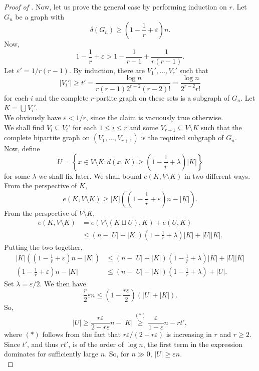 \begin{proof}[Proof of ]
				Now, let us prove the general case by performing induction on $r$. Let $G_n$ be a graph with
				\[ \delta(G_n) \ge \left(1 - \frac{1}{r} + \varepsilon\right)n. \]
				Now,
				\[ 1 - \frac{1}{r} + \varepsilon > 1 - \frac{1}{r-1} + \frac{1}{r(r-1)}. \]
				Let $\varepsilon' = 1 / r(r-1)$. By induction, there are $V_1',\ldots,V_r'$ such that 
				\begin{equation}
					\label{eqn: ESS expression for t'}
					|V_i'| \ge t' = \frac{\log n}{r(r-1) 2^{r-2} (r-2)!} = \frac{\log n}{2^{r-2} r!}
				\end{equation}
				for each $i$ and the complete $r$-partite graph on these sets is a subgraph of $G_n$. Let $K = \bigcup V_i'$.\\
				We obviously have $\varepsilon < 1/r$, since the claim is vacuously true otherwise.\\
				We shall find $V_i \subseteq V_i'$ for each $1 \le i \le r$ and some $V_{r+1} \subseteq V \setminus K$ such that the complete bipartite graph on $(V_1,\ldots,V_{r+1})$ is the required subgraph of $G_n$.\\
				Now, define
				\[ U = \left\{x \in V\setminus K : d(x,K) \ge \left(1 - \frac{1}{r} + \lambda\right)|K| \right\} \]
				for some $\lambda$ we shall fix later. We shall bound $e(K,V\setminus K)$ in two different ways. From the perspective of $K$,
				\[ e(K,V\setminus K) \ge |K| \left(\left(1 - \frac{1}{r} + \varepsilon\right)n - |K|\right). \]
				From the perspective of $V\setminus K$,
				\begin{align*}
					e(K, V\setminus K) &= e(V\setminus (K\sqcup U), K) + e(U,K) \\
					&\le \left(n - |U| - |K|\right) \left(1 - \frac{1}{r} + \lambda\right)|K| + |U||K|.
				\end{align*}
				Putting the two together,
				\begin{align*}
					|K| \left(\left(1 - \frac{1}{r} + \varepsilon\right)n - |K|\right) &\le \left(n - |U| - |K|\right) \left(1 - \frac{1}{r} + \lambda\right)|K| + |U||K| \\
					\left(1 - \frac{1}{r} + \varepsilon\right)n - |K| &\le \left(n - |U| - |K|\right) \left(1 - \frac{1}{r} + \lambda\right) + |U|.
				\end{align*}
				Set $\lambda = \varepsilon/2$. We then have
				\[ \frac{r}{2}\varepsilon n \le \left(1 - \frac{r\varepsilon}{2}\right)(|U| + |K|). \]
				So,
				\[ |U| \ge \frac{r\varepsilon}{2 - r\varepsilon} n - |K| \stackrel{(*)}{\ge} \frac{\varepsilon}{1-\varepsilon}n - rt', \]
				where $(*)$ follows from the fact that $r\varepsilon/(2-r\varepsilon)$ is increasing in $r$ and $r\ge 2$.\\
				Since $t'$, and thus $rt'$, is of the order of $\log n$, the first term in the expression dominates for sufficiently large $n$. So, for $n\gg 0$, $|U| \ge \varepsilon n$.\\


\end{proof}
